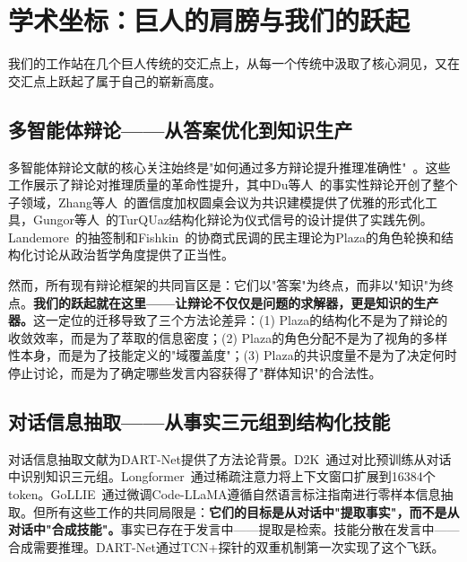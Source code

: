 \documentclass[twocolumn,10.5pt]{ctexart}
\begin{document}
\section{学术坐标：巨人的肩膀与我们的跃起}

我们的工作站在几个巨人传统的交汇点上，从每一个传统中汲取了核心洞见，又在交汇点上跃起了属于自己的崭新高度。

\subsection{多智能体辩论——从答案优化到知识生产}

多智能体辩论文献的核心关注始终是"如何通过多方辩论提升推理准确性"~\cite{du2023improving,liang2023encouraging,zhang2024reconcile,xiong2023dubi}。这些工作展示了辩论对推理质量的革命性提升，其中Du等人~\cite{du2023improving}的事实性辩论开创了整个子领域，Zhang等人~\cite{zhang2024reconcile}的置信度加权圆桌会议为共识建模提供了优雅的形式化工具，Gungor等人~\cite{gungor2025turquaz}的TurQUaz结构化辩论为仪式信号的设计提供了实践先例。Landemore~\cite{landemore2020open}的抽签制和Fishkin~\cite{fishkin2018democracy}的协商式民调的民主理论为Plaza的角色轮换和结构化讨论从政治哲学角度提供了正当性。

然而，所有现有辩论框架的共同盲区是：它们以"答案"为终点，而非以"知识"为终点。\textbf{我们的跃起就在这里——让辩论不仅仅是问题的求解器，更是知识的生产器。}这一定位的迁移导致了三个方法论差异：(1) Plaza的结构化不是为了辩论的收敛效率，而是为了萃取的信息密度；(2) Plaza的角色分配不是为了视角的多样性本身，而是为了技能定义的"域覆盖度"；(3) Plaza的共识度量不是为了决定何时停止讨论，而是为了确定哪些发言内容获得了"群体知识"的合法性。

\subsection{对话信息抽取——从事实三元组到结构化技能}

对话信息抽取文献为DART-Net提供了方法论背景。D2K~\cite{yu2022d2k}通过对比预训练从对话中识别知识三元组。Longformer~\cite{beltagy2020longformer}通过稀疏注意力将上下文窗口扩展到16384个token。GoLLIE~\cite{sainz2023gollie}通过微调Code-LLaMA遵循自然语言标注指南进行零样本信息抽取。但所有这些工作的共同局限是：\textbf{它们的目标是从对话中"提取事实"，而不是从对话中"合成技能"。}事实已存在于发言中——提取是检索。技能分散在发言中——合成需要推理。DART-Net通过TCN+探针的双重机制第一次实现了这个飞跃。
\end{document}
